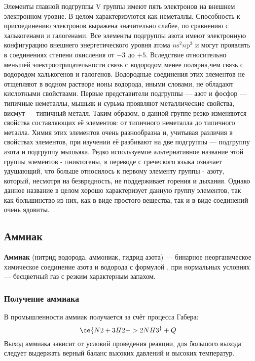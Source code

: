      Элементы главной подгруппы V группы имеют пять электронов на внешнем электронном уровне. В целом характеризуются как неметаллы. Способность к присоединению электронов выражена значительно слабее, по сравнению с халькогенами и галогенами. Все элементы подгруппы азота имеют электронную конфигурацию внешнего энергетического уровня атома $n\mathrm{s}^{2}n\mathrm{p}^{3}$ и могут проявлять в соединениях степени окисления от $−3$ до $+5$. Вследствие относительно меньшей электроотрицательности связь с водородом менее полярна,чем связь с водородом халькогенов и галогенов. Водородные соединения этих элементов не отщепляют в водном растворе ионы водорода, иными словами, не обладают кислотными свойствами. Первые представители подгруппы — азот и фосфор — типичные неметаллы, мышьяк и сурьма проявляют металлические свойства, висмут — типичный металл. Таким образом, в данной группе резко изменяются свойства составляющих её элементов: от типичного неметалла до типичного металла. Химия этих элементов очень разнообразна и, учитывая различия в свойствах элементов, при изучении её разбивают на две подгруппы — подгруппу азота и подгруппу мышьяка. Редко используемое альтернативное название этой группы элементов - пниктогены, в переводе с греческого языка означает удушающий, что больше относилось к первому элементу группы - азоту, который, несмотря на безвредность, не поддерживает горения и дыхания. Однако данное название в целом хорошо характеризует данную группу элементов, так как большинство из них, как в виде простого вещества, так и в виде соединений очень ядовиты.
     \subsection{Аммиак}
     \textbf{Аммиак} (нитрид водорода, аммониак, гидрид азота) — бинарное неорганическое химическое соединение азота и водорода с формулой , при нормальных условиях — бесцветный газ с резким характерным запахом.
     \subsubsection{Получение аммиака}
     В промышленности аммиак получается за счёт процесса Габера:
     \begin{equation*}
        \ce{N2 + 3H2 -> 2NH3 ^} + Q 
     \end{equation*}
     Выход аммиака зависит от условий проведения реакции, для большого выхода следует выдержать верный баланс высоких давлений и высоких температур.
     
